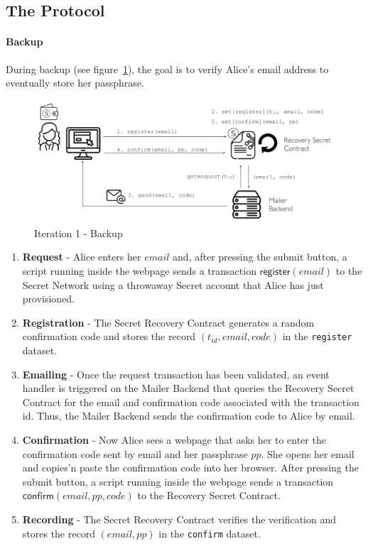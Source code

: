 \documentclass[12pt]{article}
\newcommand{\ms}[1]{\ensuremath{\mathsf{#1}}}
\begin{document}
\subsection{The Protocol}

\paragraph{Backup}

During backup (see figure~\ref{it1:backup}), the goal is to verify Alice's email address to eventually store her passphrase. 


\begin{figure}[h!]
  \includegraphics[width=\linewidth]{./media/media-001.png}
  \caption{Iteration 1 - Backup}
  \label{it1:backup}
\end{figure}

\begin{enumerate} 
\item {\bf Request} - Alice enters her $email$ and, after pressing the submit button, a script running inside the webpage sends a transaction {\bf $\ms{register}(email)$} to the Secret Network using a throwaway Secret account that Alice has just provisioned. 
\item {\bf Registration} - The Secret Recovery Contract generates a random confirmation code and stores the record $(t_{id}, email, code)$ in the {\tt register} dataset. 
\item {\bf Emailing} - Once the request transaction has been validated, an event handler is triggered on the Mailer Backend that queries the Recovery Secret Contract for the email and confirmation code associated with the transaction id. Thus, the Mailer Backend sends the confirmation code to Alice by email. 
\item {\bf Confirmation} - Now Alice sees a webpage that asks her to enter the confirmation code sent by email and her passphrase $pp$. She opens her email and copies'n paste the confirmation code into her browser. After pressing the submit button, a script running inside the webpage sends a transaction $\ms{confirm}(email, pp, code)$ to the Recovery Secret Contract. 
\item {\bf Recording} - The Secret Recovery Contract verifies the verification and stores the record $(email, pp)$ in the {\tt confirm} dataset. 
\end{enumerate}
\end{document}

